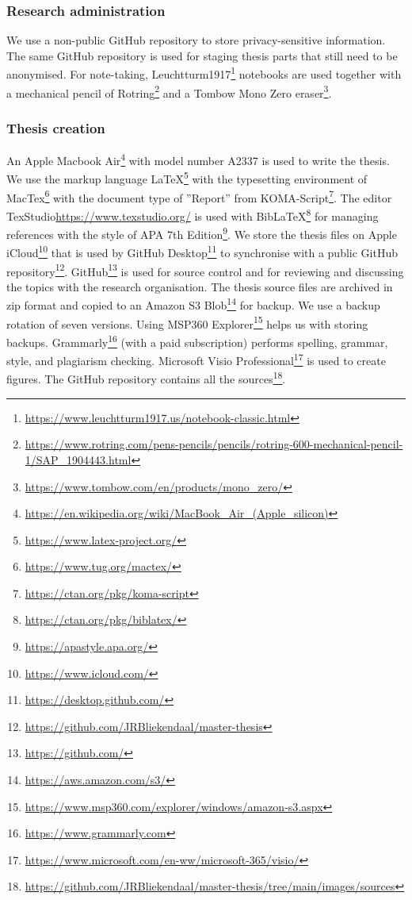 \subsubsection{Research administration}
\label{sub:tbresearchadministration}
We use a non-public GitHub repository to store privacy-sensitive information. The same GitHub repository is used for staging thesis parts that still need to be anonymised. For note-taking, Leuchtturm1917\footnote{\url{https://www.leuchtturm1917.us/notebook-classic.html}} notebooks are used together with a mechanical pencil of Rotring\footnote{\url{https://www.rotring.com/pens-pencils/pencils/rotring-600-mechanical-pencil-1/SAP_1904443.html}} and a Tombow Mono Zero eraser\footnote{\url{https://www.tombow.com/en/products/mono_zero/}}.
\subsubsection{Thesis creation}
\label{subsub:tbresearchcreation}
An Apple Macbook Air\footnote{\url{https://en.wikipedia.org/wiki/MacBook_Air_(Apple_silicon)}} with model number A2337 is used to write the thesis. We use the markup language \LaTeX\footnote{\url{https://www.latex-project.org/}} with the typesetting environment of MacTex\footnote{\url{https://www.tug.org/mactex/}} with the document type of ''Report'' from KOMA-Script\footnote{\url{https://ctan.org/pkg/koma-script}}. The editor TexStudio{\url{https://www.texstudio.org/}} is used with Bib\LaTeX\footnote{\url{https://ctan.org/pkg/biblatex/}} for managing references with the style of APA 7th Edition\footnote{\url{https://apastyle.apa.org/}}. We store the thesis files on Apple iCloud\footnote{\url{https://www.icloud.com/}} that is used by GitHub Desktop\footnote{\url{https://desktop.github.com/}} to synchronise with a public GitHub repository\footnote{\url{https://github.com/JRBliekendaal/master-thesis}}. GitHub\footnote{\url{https://github.com/}}  is used for source control and for reviewing and discussing the topics with the research organisation. The thesis source files are archived in zip format and copied to an Amazon S3 Blob\footnote{\url{https://aws.amazon.com/s3/}} for backup. We use a backup rotation of seven versions. Using MSP360 Explorer\footnote{\url{https://www.msp360.com/explorer/windows/amazon-s3.aspx}} helps us with storing backups. Grammarly\footnote{\url{https://www.grammarly.com}} (with a paid subscription) performs spelling, grammar, style, and plagiarism checking. Microsoft Visio Professional\footnote{\url{https://www.microsoft.com/en-ww/microsoft-365/visio/}} is used to create figures. The GitHub repository contains all the sources\footnote{\url{https://github.com/JRBliekendaal/master-thesis/tree/main/images/sources}}.